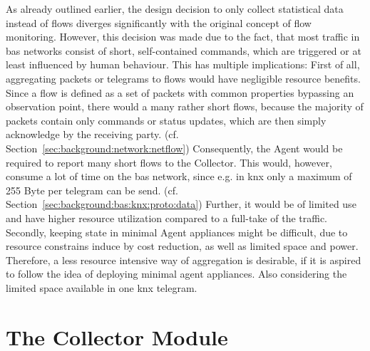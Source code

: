 As already outlined earlier, the design decision to only collect statistical data instead of flows diverges significantly with the original concept of flow monitoring.
However, this decision was made due to the fact, that most traffic in \gls{bas} networks consist of short, self-contained commands, which are triggered or at least influenced by human behaviour. This has multiple implications:
First of all, aggregating packets or telegrams to flows would have negligible resource benefits. Since a flow is defined as a set of packets with common properties bypassing an observation point, there would a many rather short flows, because the majority of packets contain only commands or status updates, which are then simply acknowledge by the receiving party. \parencite[cf.][]{Claise2013} (cf. Section~\ref{sec:background:network:netflow}) 
Consequently, the Agent would be required to report many short flows to the Collector. This would, however, consume a lot of time on the \gls{bas} network, since e.g. in \gls{knx} only a maximum of 255 Byte per telegram can be send. (cf. Section~\ref{sec:background:bas:knx:proto:data})
Further, it would be of limited use and have higher resource utilization compared to a full-take of the traffic.
Secondly, keeping state in minimal Agent appliances might be difficult, due to resource constrains induce by cost reduction, as well as limited space and power.
Therefore, a less resource intensive way of aggregation is desirable, if it is aspired to follow the idea of deploying minimal agent appliances.
Also considering the limited space available in one \gls{knx} telegram.

\section{The Collector Module}
\label{sec:concept:collector}

